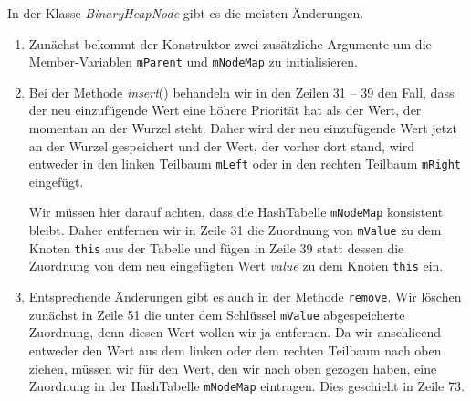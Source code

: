 In der Klasse \textsl{BinaryHeapNode} gibt es die meisten Änderungen.
\begin{enumerate}
\item Zun\"achst bekommt der Konstruktor zwei zus\"atzliche Argumente um die 
      Member-Variablen \texttt{mParent} und \texttt{mNodeMap} zu initialisieren. 
\item Bei der Methode \textsl{insert}() behandeln wir in den Zeilen 31 -- 39 
      den Fall, dass der neu einzuf\"ugende Wert eine h\"ohere Priorit\"at hat als der Wert, der
      momentan an der Wurzel steht.  Daher wird der neu einzuf\"ugende Wert
      jetzt an der Wurzel gespeichert und der Wert, der vorher dort stand,
      wird entweder in den linken Teilbaum \texttt{mLeft} oder in den
      rechten Teilbaum \texttt{mRight} eingef\"ugt.

      Wir m\"ussen hier darauf achten, dass die HashTabelle \texttt{mNodeMap} konsistent
      bleibt.  Daher entfernen wir in Zeile 31 die Zuordnung von \texttt{mValue} zu dem
      Knoten \texttt{this} aus der Tabelle und f\"ugen in Zeile 39 statt dessen 
      die Zuordnung von dem neu eingef\"ugten Wert \textsl{value} zu dem Knoten
      \texttt{this} ein.
\item Entsprechende Änderungen gibt es auch in der Methode \texttt{remove}.
      Wir l\"oschen zun\"achst in Zeile 51 die unter dem Schl\"ussel \texttt{mValue}
      abgespeicherte Zuordnung, denn diesen Wert wollen wir ja entfernen.
      Da wir anschlie\3end entweder den Wert aus dem linken oder dem rechten Teilbaum 
      nach oben ziehen, m\"ussen wir f\"ur den Wert, den wir nach oben gezogen haben,
      eine Zuordnung in der HashTabelle \texttt{mNodeMap} eintragen. Dies geschieht
      in Zeile 73.


\end{enumerate}
